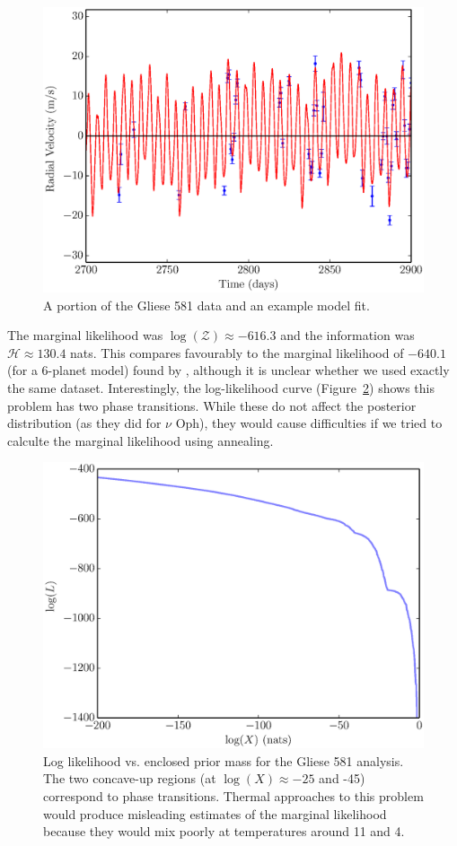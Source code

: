 \documentclass[useAMS,usenatbib]{mn2e}
\begin{document}
\begin{figure}
\includegraphics[scale=0.45]{Figures/gliese581.eps}
\caption{A portion of the Gliese 581 data and an example model fit.
\label{fig:gliese581}}
\end{figure}


The marginal likelihood was $\log(\mathcal{Z}) \approx -616.3$ and the
information was $\mathcal{H} \approx 130.4$ nats. This compares favourably
to the marginal likelihood of $-640.1$ (for a 6-planet model)
found by \citet{fengji}, although it is unclear whether we used exactly the
same dataset.
Interestingly, the log-likelihood curve (Figure~\ref{fig:logl})
shows this problem has two phase transitions. While these do not affect the
posterior distribution (as they did for $\nu$ Oph), they would cause difficulties
if we tried to calculte the marginal likelihood using annealing.

\begin{figure}
\includegraphics[scale=0.45]{Figures/logl.eps}
\caption{Log likelihood vs. enclosed prior mass for the Gliese 581 analysis.
The two concave-up regions (at $\log(X) \approx -25$ and -45) correspond to
phase transitions. Thermal approaches to this problem would produce misleading
estimates of the marginal likelihood because they would mix poorly at temperatures
around 11 and 4.
\label{fig:logl}}
\end{figure}
\end{document}
